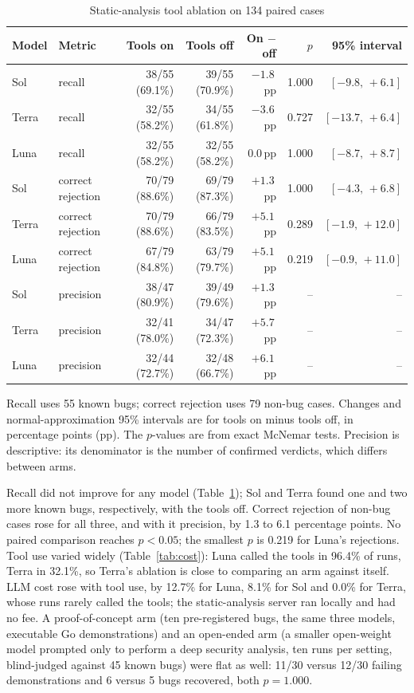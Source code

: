 \documentclass[11pt,a4paper]{article}
\newcommand{\pp}{\,pp}
\newcommand{\tablenote}[1]{\par\smallskip\begin{minipage}{\linewidth}\footnotesize\raggedright #1\end{minipage}}
\begin{document}
\begin{table}[t]
\centering\small
\caption{Static-analysis tool ablation on 134 paired cases}
\label{tab:ablation}
\begin{tabular}{@{}llrrrrr@{}}
\toprule
Model & Metric & Tools on & Tools off & On $-$ off & $p$ & 95\% interval \\
\midrule
Sol   & recall            & 38/55 (69.1\%) & 39/55 (70.9\%) & $-1.8$\pp & 1.000 & $[-9.8,\,+6.1]$ \\
Terra & recall            & 32/55 (58.2\%) & 34/55 (61.8\%) & $-3.6$\pp & 0.727 & $[-13.7,\,+6.4]$ \\
Luna  & recall            & 32/55 (58.2\%) & 32/55 (58.2\%) & $0.0$\pp  & 1.000 & $[-8.7,\,+8.7]$ \\
\midrule
Sol   & correct rejection & 70/79 (88.6\%) & 69/79 (87.3\%) & $+1.3$\pp & 1.000 & $[-4.3,\,+6.8]$ \\
Terra & correct rejection & 70/79 (88.6\%) & 66/79 (83.5\%) & $+5.1$\pp & 0.289 & $[-1.9,\,+12.0]$ \\
Luna  & correct rejection & 67/79 (84.8\%) & 63/79 (79.7\%) & $+5.1$\pp & 0.219 & $[-0.9,\,+11.0]$ \\
\midrule
Sol   & precision         & 38/47 (80.9\%) & 39/49 (79.6\%) & $+1.3$\pp & -- & -- \\
Terra & precision         & 32/41 (78.0\%) & 34/47 (72.3\%) & $+5.7$\pp & -- & -- \\
Luna  & precision         & 32/44 (72.7\%) & 32/48 (66.7\%) & $+6.1$\pp & -- & -- \\
\bottomrule
\end{tabular}
\tablenote{Recall uses 55 known bugs; correct rejection uses 79 non-bug cases. Changes and normal-approximation 95\% intervals are for tools on minus tools off, in percentage points (pp). The $p$-values are from exact McNemar tests. Precision is descriptive: its denominator is the number of confirmed verdicts, which differs between arms.}
\end{table}

Recall did not improve for any model (Table~\ref{tab:ablation}); Sol and Terra found one and two more known bugs, respectively, with the tools off. Correct rejection of non-bug cases rose for all three, and with it precision, by 1.3 to 6.1 percentage points. No paired comparison reaches $p<0.05$; the smallest $p$ is 0.219 for Luna's rejections. Tool use varied widely (Table~\ref{tab:cost}): Luna called the tools in 96.4\% of runs, Terra in 32.1\%, so Terra's ablation is close to comparing an arm against itself. LLM cost rose with tool use, by 12.7\% for Luna, 8.1\% for Sol and 0.0\% for Terra, whose runs rarely called the tools; the static-analysis server ran locally and had no fee. A proof-of-concept arm (ten pre-registered bugs, the same three models, executable Go demonstrations) and an open-ended arm (a smaller open-weight model prompted only to perform a deep security analysis, ten runs per setting, blind-judged against 45 known bugs) were flat as well: 11/30 versus 12/30 failing demonstrations and 6 versus 5 bugs recovered, both $p=1.000$.
\end{document}
